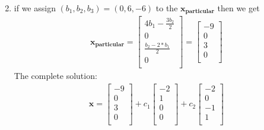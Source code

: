 \documentclass[a4paper,11pt]{article}
\newcommand{\mybf}[1]{\boldsymbol{#1}}
\begin{document}
\begin{enumerate}
\begin{align}
\end{align}
\item if we assign $(b_1, b_2,b_3) = (0, 6, -6)$ to the $\mybf{x_{particular}}$ then we get 
\begin{align}
\mybf{x_{particular}} = 
\begin{bmatrix}
4b_1-\frac{3b_2}{2} \\
0 \\
\frac{b_2-2*b_1}{2}  \\
0 \\
\end{bmatrix}
=
\begin{bmatrix}
-9 \\
0 \\
3  \\
0 \\
\end{bmatrix}
\end{align}
The complete solution:
\begin{align}
\mybf{x} = 
\begin{bmatrix}
-9 \\
0 \\
3  \\
0 \\
\end{bmatrix}
+c_1
\begin{bmatrix}
-2 \\
1 \\
0  \\
0 \\
\end{bmatrix}
+c_2
\begin{bmatrix}
-2 \\
0 \\
-1  \\
1 \\
\end{bmatrix}
\end{align}
\end{enumerate}
\end{document}
